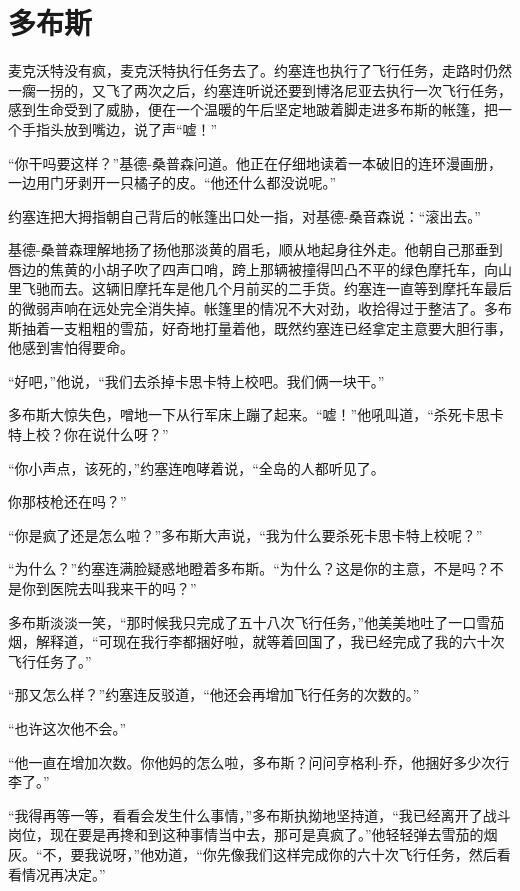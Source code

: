 \chapter{多布斯}
 
    麦克沃特没有疯，麦克沃特执行任务去了。约塞连也执行了飞行任务，走路时仍然一瘸一拐的，又飞了两次之后，约塞连听说还要到博洛尼亚去执行一次飞行任务，感到生命受到了威胁，便在一个温暖的午后坚定地跛着脚走进多布斯的帐篷，把一个手指头放到嘴边，说了声“嘘！”

    “你干吗要这样？”基德-桑普森问道。他正在仔细地读着一本破旧的连环漫画册，一边用门牙剥开一只橘子的皮。“他还什么都没说呢。”

    约塞连把大拇指朝自己背后的帐篷出口处一指，对基德-桑音森说：“滚出去。”

    基德-桑普森理解地扬了扬他那淡黄的眉毛，顺从地起身往外走。他朝自己那垂到唇边的焦黄的小胡子吹了四声口哨，跨上那辆被撞得凹凸不平的绿色摩托车，向山里飞驰而去。这辆旧摩托车是他几个月前买的二手货。约塞连一直等到摩托车最后的微弱声响在远处完全消失掉。帐篷里的情况不大对劲，收拾得过于整洁了。多布斯抽着一支粗粗的雪茄，好奇地打量着他，既然约塞连已经拿定主意要大胆行事，他感到害怕得要命。

    “好吧，”他说，“我们去杀掉卡思卡特上校吧。我们俩一块干。”

    多布斯大惊失色，噌地一下从行军床上蹦了起来。“嘘！”他吼叫道，“杀死卡思卡特上校？你在说什么呀？”

    “你小声点，该死的，”约塞连咆哮着说，“全岛的人都听见了。

    你那枝枪还在吗？”

    “你是疯了还是怎么啦？”多布斯大声说，“我为什么要杀死卡思卡特上校呢？”

    “为什么？”约塞连满脸疑惑地瞪着多布斯。“为什么？这是你的主意，不是吗？不是你到医院去叫我来干的吗？”

    多布斯淡淡一笑，“那时候我只完成了五十八次飞行任务，”他美美地吐了一口雪茄烟，解释道，“可现在我行李都捆好啦，就等着回国了，我已经完成了我的六十次飞行任务了。”

    “那又怎么样？”约塞连反驳道，“他还会再增加飞行任务的次数的。”

    “也许这次他不会。”

    “他一直在增加次数。你他妈的怎么啦，多布斯？问问亨格利-乔，他捆好多少次行李了。”

    “我得再等一等，看看会发生什么事情，”多布斯执拗地坚持道，“我已经离开了战斗岗位，现在要是再搀和到这种事情当中去，那可是真疯了。”他轻轻弹去雪茄的烟灰。“不，要我说呀，”他劝道，“你先像我们这样完成你的六十次飞行任务，然后看看情况再决定。”

